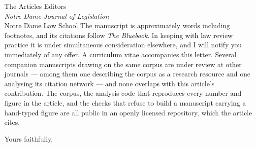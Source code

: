 \documentclass[11pt]{letter}
\begin{document}
\begin{letter}{The Articles Editors\\
\emph{Notre Dame Journal of Legislation}\\
Notre Dame Law School}
The manuscript is approximately \nWords{} words including footnotes, and its citations follow \emph{The Bluebook}. In keeping with law review practice it is under simultaneous consideration elsewhere, and I will notify you immediately of any offer. A curriculum vitae accompanies this letter. Several companion manuscripts drawing on the same
corpus are under review at other journals --- among them one describing the
corpus as a research resource and one analysing its citation network --- and
none overlaps with this article's contribution. The corpus, the analysis code
that reproduces every number and figure in the article, and the checks that
refuse to build a manuscript carrying a hand-typed figure are all public in an
openly licensed repository, which the article cites.

\closing{Yours faithfully,}

\end{letter}
\end{document}
